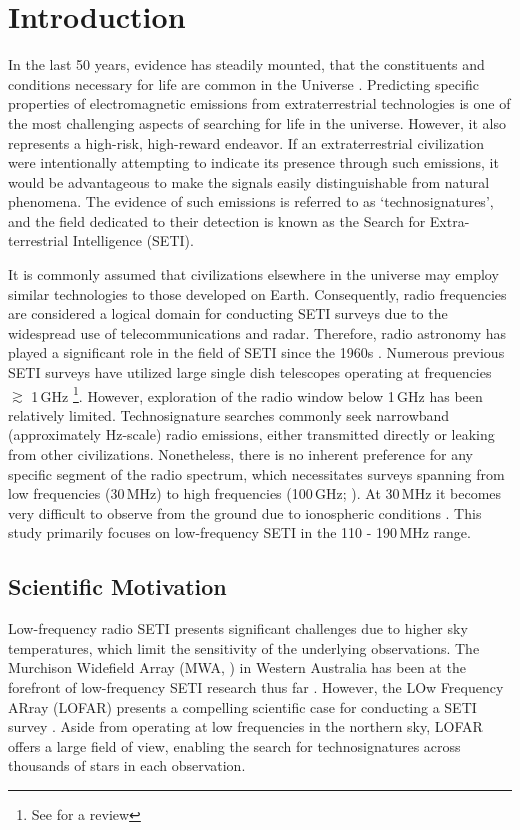 \section{Introduction}
\label{sect:intro}
In the last 50 years, evidence has steadily mounted, that the constituents and conditions necessary for life are common in the Universe \citep{Wordsworth2014}. Predicting specific properties of electromagnetic emissions from extraterrestrial technologies is one of the most challenging aspects of searching for life in the universe. However, it also represents a high-risk, high-reward endeavor. If an extraterrestrial civilization were intentionally attempting to indicate its presence through such emissions, it would be advantageous to make the signals easily distinguishable from natural phenomena. The evidence of such emissions is referred to as `technosignatures', and the field dedicated to their detection is known as the Search for Extra-terrestrial Intelligence (SETI).


It is commonly assumed that civilizations elsewhere in the universe may employ similar technologies to those developed on Earth. Consequently, radio frequencies are considered a logical domain for conducting SETI surveys due to the widespread use of telecommunications and radar. Therefore, radio astronomy has played a significant role in the field of SETI since the 1960s \citep{Drake:1961bv, Tarter:1980p1516}. Numerous previous SETI surveys have utilized large single dish telescopes operating at frequencies $\gtrsim$ 1\,GHz \citep{Tarter:1996jf, Siemion_KEPLER_ApJ, Enriquez:2017} \footnote{See \citealt{wright18} for a review}. However, exploration of the radio window below 1\,GHz has been relatively limited. Technosignature searches commonly seek narrowband (approximately Hz-scale) radio emissions, either transmitted directly or leaking from other civilizations. Nonetheless, there is no inherent preference for any specific segment of the radio spectrum, which necessitates surveys spanning from low frequencies (30\,MHz) to high frequencies (100\,GHz; \citealt{Cherry_2022}). At 30\,MHz it becomes very difficult to observe from the ground due to ionospheric conditions \citep[see][chap.~7.8]{burke_graham-smith_wilkinson_2019}. This study primarily focuses on low-frequency SETI in the 110 - 190\,MHz range.

\subsection{Scientific Motivation}
Low-frequency radio SETI presents significant challenges due to higher sky temperatures, which limit the sensitivity of the underlying observations. The Murchison Widefield Array (MWA, \citealt{2013PASA...30....7T}) in Western Australia has been at the forefront of low-frequency SETI research thus far \citep{tingay:center,tingay:anticenter,tingay:omm}. However, the LOw Frequency ARray (LOFAR) presents a compelling scientific case for conducting a SETI survey \citep{Eavesdropping}. Aside from operating at low frequencies in the northern sky, LOFAR offers a large field of view, enabling the search for technosignatures across thousands of stars in each observation. 

